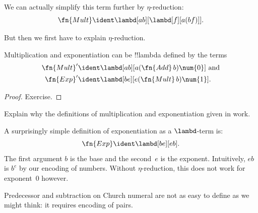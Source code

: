\documentclass[../../../include/open-logic-section]{subfiles}
\begin{document}
\begin{editorial}
We can actually simplify this term further by $\eta$-reduction:
\[
  \fn{Mult} \ident \lambd[ab][\lambd[f][a (b f)]].
\]

But then we first have to explain $\eta$-reduction.
\end{editorial}

\begin{prop}
Multiplication and exponentiation can be !!{lambda define}d by the terms
\begin{align*}
  \fn{Mult}' & \ident \lambd[ab][a (\fn{Add}\, b) \num{0}] \text{ and}\\
  \fn{Exp}'  & \ident \lambd[be][e (\fn{Mult}\, b) \num{1}].
\end{align*}
\end{prop}

\begin{proof}
  Exercise.
\end{proof}

\begin{prob}
  Explain why the definitions of multiplication and exponentiation
  given in  work.
\end{prob}

\begin{editorial}
A surprisingly simple definition of exponentiation as a $\lambd$-term is:
\[
  \fn{Exp} \ident \lambd[be][e b].
\]
The first argument $b$ is the base and the second~$e$ is the exponent.
Intuitively, $e b$ is $b^e$ by our encoding of numbers. Without
$\eta$-reduction, this does not work for exponent~$0$ however.
\end{editorial}

Predecessor and subtraction on Church numeral are not as easy to
define as we might think: it requires encoding of pairs.
\end{document}
